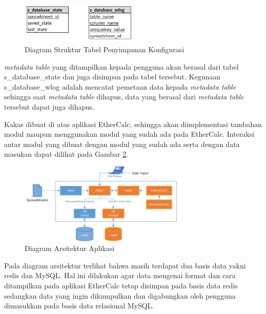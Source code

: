 \begin{figure}[htb]
	\centering
	\includegraphics[width=0.5\textwidth]{resources/chapter-4-architect-db.png}
	\caption{Diagram Struktur Tabel Penyimpanan Konfigurasi}
	\label{StructureDiagram}
\end{figure}

\textit{metadata table} yang ditampilkan kepada pengguna akan berasal dari tabel s\_database\_state dan juga disimpan pada tabel tersebut. Kegunaan  s\_database\_wlog adalah mencatat pemetaan data kepada \textit{metadata table} sehingga saat \textit{metadata table} dihapus, data yang berasal dari \textit{metadata table} tersebut dapat juga dihapus.

Kakas dibuat di atas aplikasi EtherCalc, sehingga akan diimplementasi tambahan modul maupun menggunakan modul yang sudah ada pada EtherCalc. Interaksi antar modul yang dibuat dengan modul yang sudah ada serta dengan data masukan dapat dilihat pada Gambar \ref{ArchDiagram}.

\begin{figure}[htb]
	\centering
	\includegraphics[width=0.7\textwidth]{resources/chapter-4-architecture.png}
	\caption{Diagram Arsitektur Aplikasi}
	\label{ArchDiagram}
\end{figure}

Pada diagram arsitektur terlihat bahwa masih terdapat dua basis data yakni redis dan MySQL. Hal ini dilakukan agar data mengenai format dan cara ditampilkan pada aplikasi EtherCalc tetap disimpan pada basis data redis sedangkan data yang ingin dikumpulkan dan digabungkan oleh pengguna dimasukkan pada basis data relasional MySQL.


